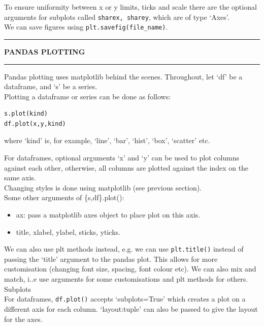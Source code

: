 \documentclass[8pt]{extarticle}
\newcommand{\heading}[1]{%
    \noindent
    \rule{\linewidth}{0.4pt}
    \begin{center}
        \vspace{-1ex}
        \textbf{#1}        
        \vspace{-2.5ex}
    \end{center}
    \rule{\linewidth}{0.4pt}
}
\begin{document}
\begin{multicols}{4}
To ensure uniformity between x or y limits, ticks and scale there are the optional arguments for subplots called \lstinline[style=Python]!sharex, sharey!, which are of type `Axes'.\\

We can save figures using \lstinline[style=Python]!plt.savefig(file_name)!.
\columnbreak

\heading{PANDAS PLOTTING}

Pandas plotting uses matplotlib behind the scenes. Throughout, let `df' be a dataframe, and `s' be a series. \\

Plotting a dataframe or series can be done as follows:

\begin{lstlisting}[style=Python]
s.plot(kind)
df.plot(x,y,kind)
\end{lstlisting}
where `kind' is, for example, `line', `bar', `hist', `box', `scatter' etc. 

For dataframes, optional arguments `x' and `y' can be used to plot columns against each other, otherwise, all columns are plotted against the index on the same axis.\\

Changing styles is done using matplotlib (see previous section).\\

Some other arguments of \{s,df\}.plot():
\begin{itemize}
    \item ax: pass a matplotlib axes object to place plot on this axis.
    \item title, xlabel, ylabel, sticks, yticks.
\end{itemize}
We can also use plt methods instead, e.g. we can use \lstinline[style=Python]!plt.title()! instead of passing the `title' argument to the pandas plot. This allows for more customisation (changing font size, spacing, font colour etc). We can also mix and match, i..e use arguments for some customisations and plt methods for others.\\

Subplots \\

For dataframes, \lstinline[style=Python]!df.plot()! accepts `subplots=True' which creates a plot on a different axis for each column. `layout:tuple' can also be passed to give the layout for the axes. \\


\end{multicols}
\end{document}
